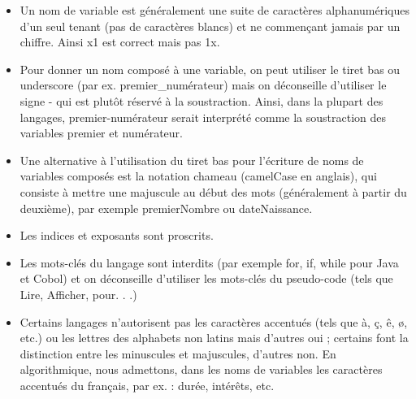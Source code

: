 \documentclass[11pt,a4paper]{article}
\begin{document}
					\begin{itemize}
				
			\item 
            Un nom de variable est g\'en\'eralement une suite de caract\`eres alphanum\'eriques d'un
            seul tenant (pas de caract\`eres blancs) et ne commen\c cant jamais par un chiffre. Ainsi
            x1 est correct mais pas 1x.
            
			\item 
            Pour donner un nom compos\'e \`a une variable, on peut utiliser le \guillemotleft  tiret bas \guillemotright  ou underscore 
            (par ex. premier\_num\'erateur) mais on d\'econseille d'utiliser le signe \guillemotleft  - \guillemotright  qui est
            plut\^ot r\'eserv\'e \`a la soustraction. Ainsi, dans la plupart des langages, premier-num\'erateur
            serait interpr\'et\'e comme la soustraction des variables premier et num\'erateur.
            
			\item 
            Une alternative \`a l'utilisation du tiret bas pour l'\'ecriture de noms de variables compos\'es
            est la notation \guillemotleft  chameau \guillemotright  (camelCase en anglais), qui consiste \`a mettre une majuscule
            au d\'ebut des mots (g\'en\'eralement \`a partir du deuxi\`eme), par exemple premierNombre
            ou dateNaissance.
            
			\item 
            Les indices et exposants sont proscrits.
            
			\item 
            Les mots-cl\'es du langage sont interdits (par exemple for, if, while pour Java et Cobol)
            et on d\'econseille d'utiliser les mots-cl\'es du pseudo-code (tels que Lire, Afficher, pour. . .)
            
			\item 
            Certains langages n'autorisent pas les caract\`eres accentu\'es (tels que \`a, \c c, \^e, \o, etc.)
            ou les lettres des alphabets non latins mais d'autres oui ; certains font la
            distinction entre les minuscules et majuscules, d'autres non. En algorithmique, nous
            admettons, dans les noms de variables les caract\`eres accentu\'es du fran\c cais, par ex. :
            dur\'ee, int\'er\^ets, etc.
            
					\end{itemize}
				
\end{document}
